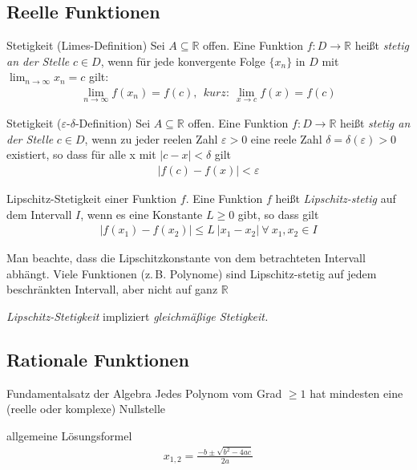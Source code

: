 \subsection{Reelle Funktionen}
\begin{karte}{Stetigkeit (Limes-Definition)}
	Sei \(A\subseteq\mathbb{R}\) offen. Eine Funktion \(f:D\to\mathbb{R}\) heißt \emph{stetig an der Stelle} \(c \in D\), wenn für jede konvergente Folge \(\{ x_{n} \} \) in \(D\) mit \(\displaystyle\lim_{n\to\infty} x_n = c\) gilt:
	\begin{align}
		\lim_{n\to\infty} f(x_n)=f(c),\ \ kurz:\ \lim_{x\to c}f(x)=f(c)
	\end{align}
\end{karte}

\begin{karte}{Stetigkeit (\(\varepsilon\text{-}\delta \)-Definition)}
	Sei \(A\subseteq\mathbb{R}\) offen. Eine Funktion \(f:D\to\mathbb{R}\) heißt \emph{stetig an der Stelle} \(c \in D\), wenn zu jeder reelen Zahl \(\varepsilon > 0\) eine reele Zahl \(\delta=\delta(\varepsilon)>0\) existiert, so dass für alle x mit \(|c-x|<\delta \) gilt
	\begin{align}
		|f(c)-f(x)|<\varepsilon
	\end{align}

\end{karte}

\begin{karte}{Lipschitz-Stetigkeit einer Funktion \(f\).}%
	Eine Funktion \(f\) heißt \emph{Lipschitz-stetig} auf dem Intervall \(I\), wenn es eine Konstante \(L\geq0\) gibt, so dass gilt
	\begin{align}
		\lvert f(x_1) - f(x_2) \rvert\leq L\ \lvert x_1 - x_2 \rvert\  \forall \  x_1,x_2\in I
	\end{align}
	{\large Man beachte, dass die Lipschitzkonstante von dem betrachteten Intervall abhängt. Viele Funktionen (z.\,B. Polynome) sind Lipschitz-stetig auf jedem beschränkten Intervall, aber nicht auf ganz $\mathbb{R}$\par}
	\vspace{5mm}
	\emph{Lipschitz-Stetigkeit} impliziert \emph{gleichmäßige Stetigkeit.}

\end{karte}

\subsection{Rationale Funktionen}

\begin{karte}{Fundamentalsatz der Algebra}
	Jedes Polynom vom Grad \(\geq 1\) hat mindesten eine (reelle oder komplexe) Nullstelle
\end{karte}

\begin{karte}{allgemeine Lösungsformel}
	\begin{align}
		x_{1,2}=\frac{-b\pm\sqrt{b^2-4ac}}{2a}
	\end{align}
\end{karte}
